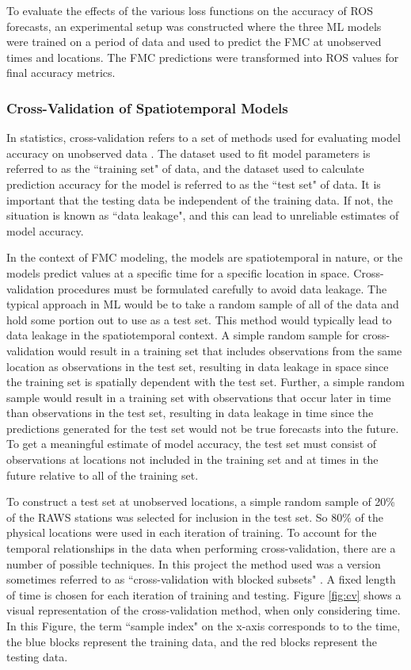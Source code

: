 \documentclass[11pt]{article}%
\begin{document}
To evaluate the effects of the various loss functions on the accuracy of ROS forecasts, an experimental setup was constructed where the three ML models were trained on a period of data and used to predict the FMC at unobserved times and locations. The FMC predictions were transformed into ROS values for final accuracy metrics. 

\subsubsection{Cross-Validation of Spatiotemporal Models}
\label{sec:cv}
\hfill

In statistics, cross-validation refers to a set of methods used for evaluating model accuracy on unobserved data \citep[Chap.\  7.10]{Hastie-2010-ESL}. The dataset used to fit model parameters is referred to as the ``training set" of data, and the dataset used to calculate prediction accuracy for the model is referred to as the ``test set" of data. It is important that the testing data be independent of the training data. If not, the situation is known as ``data leakage", and this can lead to unreliable estimates of model accuracy.

In the context of FMC modeling, the models are spatiotemporal in nature, or the models predict values at a specific time for a specific location in space. Cross-validation procedures must be formulated carefully to avoid data leakage. The typical approach in ML would be to take a random sample of all of the data and hold some portion out to use as a test set. This method would typically lead to data leakage in the spatiotemporal context. A simple random sample for cross-validation would result in a training set that includes observations from the same location as observations in the test set, resulting in data leakage in space since the training set is spatially dependent with the test set. Further, a simple random sample would result in a training set with observations that occur later in time than observations in the test set, resulting in data leakage in time since the predictions generated for the test set would not be true forecasts into the future. To get a meaningful estimate of model accuracy, the test set must consist of observations at locations not included in the training set and at times in the future relative to all of the training set. 

To construct a test set at unobserved locations, a simple random sample of 20\% of the RAWS stations was selected for inclusion in the test set. So 80\% of the physical locations were used in each iteration of training. To account for the temporal relationships in the data when performing cross-validation, there are a number of possible techniques. In this project the method used was a version sometimes referred to as ``cross-validation with blocked subsets" \citep[p.\ 199]{Bergmeir-2012-OUC}. A fixed length of time is chosen for each iteration of training and testing. Figure \ref{fig:cv} shows a visual representation of the cross-validation method, when only considering time. In this Figure, the term ``sample index" on the x-axis corresponds to to the time, the blue blocks represent the training data, and the red blocks represent the testing data.
\end{document}
